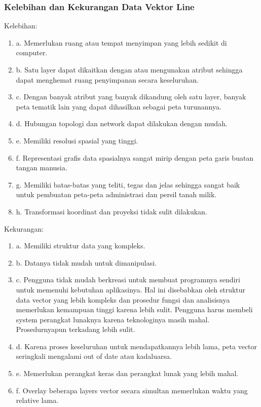  \subsubsection{Kelebihan dan Kekurangan Data Vektor Line}
 Kelebihan:
 \begin{enumerate}
    \item a. Memerlukan ruang atau tempat menyimpan yang lebih sedikit di computer.
    \item b. Satu layer dapat dikaitkan dengan atau mengunakan atribut sehingga dapat menghemat ruang penyimpanan secara keseluruhan.
    \item c. Dengan banyak atribut yang banyak dikandung oleh satu layer, 
             banyak peta tematik lain yang dapat dihasilkan sebagai peta turunannya.
    \item d. Hubungan topologi dan network dapat dilakukan dengan mudah.
    \item e. Memiliki resolusi spasial yang tinggi.
    \item f. Representasi grafis data spasialnya sangat mirip dengan peta garis buatan tangan manusia.
    \item g. Memiliki batas-batas yang teliti, tegas dan jelas sehingga sangat baik untuk 
    pembuatan peta-peta administrasi dan persil tanah milik.
    \item h. Transformasi koordinat dan proyeksi tidak sulit dilakukan. 
 \end{enumerate}
 Kekurangan:
 \begin{enumerate}
    \item a. Memiliki struktur data yang kompleks.
    \item b. Datanya tidak mudah untuk dimanipulasi.
    \item c. Pengguna tidak mudah berkreasi untuk membuat programnya sendiri untuk memenuhi kebutuhan aplikasinya. 
             Hal ini disebabkan oleh struktur data vector yang lebih kompleks dan prosedur fungsi dan analisisnya 
             memerlukan kemampuan tinggi karena lebih sulit. 
            Pengguna harus membeli system perangkat lunaknya karena teknologinya masih mahal. Prosedurnyapun terkadang lebih sulit.
    \item d. Karena proses keseluruhan untuk mendapatkannya lebih lama, peta vector seringkali mengalami out of date atau kadaluarsa.
    \item e. Memerlukan perangkat keras dan perangkat lunak yang lebih mahal.
    \item f. Overlay beberapa layers vector secara simultan memerlukan waktu yang relative lama.
 \end{enumerate}
 
